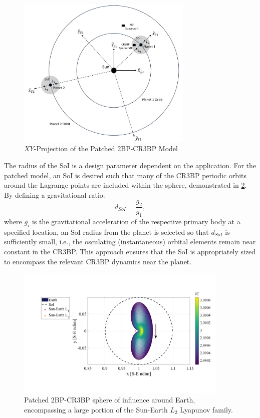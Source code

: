\begin{figure}[H]
    \centering
    \includegraphics[width=0.75\textwidth]{figures/TBP-CR3BP.jpg}
    \caption{$XY$-Projection of the Patched 2BP-CR3BP Model}
    \label{fig:2BP-CR3BP}
\end{figure}

The radius of the SoI is a design parameter dependent on the application. For the patched model,
an SoI is desired such that many of the CR3BP periodic orbits around the Lagrange points are
included within the sphere, demonstrated in \cref{fig:SoI}. By defining a gravitational ratio:
\begin{equation}
    d_{SoI}=\frac{g_{2}}{g_{1}},
    \label{eq:patchedSoI}
\end{equation}
where $g_{i}$ is the gravitational acceleration of the respective primary body at a specified
location, an SoI radius from the planet is selected so that $d_{SoI}$ is sufficiently small,
i.e., the osculating (instantaneous) orbital elements remain near constant in the
CR3BP\cite{Canales:2021b}. This approach ensures that the SoI is appropriately sized to encompass
the relevant CR3BP dynamics near the planet.

\begin{figure}[H]
    \centering
    \includegraphics[width=0.9\textwidth]{figures/SoI.pdf}
    \caption{Patched 2BP-CR3BP sphere of influence around Earth, encompassing a large portion of the Sun-Earth $L_{2}$ Lyapunov family.}
    \label{fig:SoI}
\end{figure}

